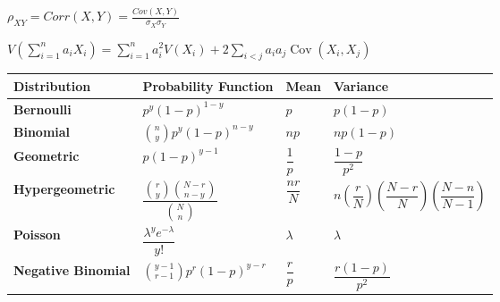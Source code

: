 \documentclass[
  letterpaper,
  DIV=11,
  numbers=noendperiod]{scrartcl}
\begin{document}
\(\rho_{XY} = Corr(X,Y) = \frac{Cov(X,Y)}{\sigma_X\sigma_Y}\)

\(V\left(\sum_{i=1}^n a_i X_i\right)
= \sum_{i=1}^n a_i^2 V(X_i)
+ 2\sum_{i<j} a_i a_j \operatorname{Cov}(X_i,X_j)\)

\begin{longtable}[]{@{}
  >{\raggedright\arraybackslash}p{}
  >{\raggedright\arraybackslash}p{}
  >{\raggedright\arraybackslash}p{}
  >{\raggedright\arraybackslash}p{}@{}}
\toprule\noalign{}
\begin{minipage}[b]{\linewidth}\raggedright
\textbf{Distribution}
\end{minipage} & \begin{minipage}[b]{\linewidth}\raggedright
\textbf{Probability Function}
\end{minipage} & \begin{minipage}[b]{\linewidth}\raggedright
\textbf{Mean}
\end{minipage} & \begin{minipage}[b]{\linewidth}\raggedright
\textbf{Variance}
\end{minipage} \\
\midrule\noalign{}
\endhead
\bottomrule\noalign{}
\endlastfoot
\textbf{Bernoulli} & \(p^y (1-p)^{1-y}\) & \(p\) & \(p(1-p)\) \\
\textbf{Binomial} & \(\binom{n}{y} p^y (1-p)^{n-y}\) & \(np\) &
\(np(1-p)\) \\
\textbf{Geometric} & \(p(1-p)^{y-1}\) & \(\dfrac{1}{p}\) &
\(\dfrac{1-p}{p^2}\) \\
\textbf{Hypergeometric} &
\(\dfrac{\binom{r}{y}\binom{N-r}{n-y}}{\binom{N}{n}}\) &
\(\dfrac{nr}{N}\) &
\(n \left(\dfrac{r}{N}\right)\left(\dfrac{N-r}{N}\right)\left(\dfrac{N-n}{N-1}\right)\) \\
\textbf{Poisson} & \(\dfrac{\lambda^y e^{-\lambda}}{y!}\) & \(\lambda\)
& \(\lambda\) \\
\textbf{Negative Binomial} & \(\binom{y-1}{r-1} p^r (1-p)^{y - r}\) &
\(\dfrac{r}{p}\) & \(\dfrac{r(1-p)}{p^2}\) \\
\end{longtable}

\pagebreak
\end{document}
